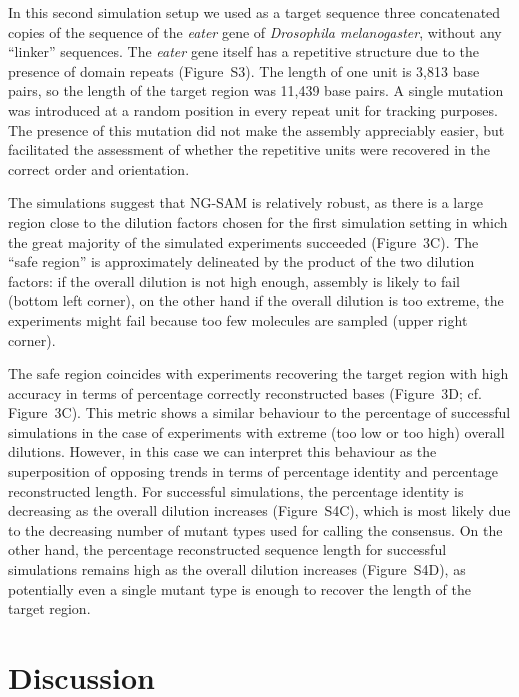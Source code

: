 \documentclass[10pt]{article}
\newcommand{\red}[1]{{\color{red} #1}}
\newcommand{\blue}[1]{{\color{blue} #1}}
\begin{document}
In this second simulation setup we used as a target sequence three concatenated copies of the sequence of the {\it eater} gene of {\it Drosophila melanogaster}, without any ``linker'' sequences. The {\it eater} gene itself has a repetitive structure \red{\cite{kocks05,somogyi08}} due to the presence of domain repeats (Figure~S3). The length of one unit is 3,813 base pairs, so the length of the target region \blue{was} 11,439 base pairs. A single mutation was introduced at a random position in every repeat unit for tracking purposes. The presence of this mutation did not make the assembly appreciably easier, but facilitated the assessment of whether the repetitive units were recovered in the correct order and orientation.

The simulations suggest that NG-SAM is relatively robust, as there is a large region close to the dilution factors chosen for the first simulation setting in which the great majority of the simulated experiments succeeded (Figure~3C).
The ``safe region'' is approximately delineated by the product of the two dilution factors: if the overall dilution is not high enough, assembly is likely to fail (bottom left corner), on the other hand if the overall dilution is too extreme, the experiments might fail because too few molecules are sampled (upper right corner).

The safe region coincides with experiments recovering the target region with high accuracy in terms of \blue{percentage correctly} reconstructed bases (Figure~3D; cf. Figure~3C). This metric shows a similar behaviour to the percentage of successful simulations in the case of experiments with extreme (too low or too high) overall dilutions. However, in this case we can interpret this behaviour as the superposition of opposing trends in terms of \blue{percentage} identity and \blue{percentage} reconstructed length.
For successful simulations, the \blue{percentage} identity is decreasing as the overall dilution increases (Figure~S4C), which is most likely due to the decreasing number of mutant types used for calling the consensus. On the other hand, the \blue{percentage} reconstructed sequence length for successful simulations remains high as the overall dilution increases (Figure~S4D), as potentially even a single mutant type is enough to recover the length of the target region.

\section*{Discussion}
\end{document}
